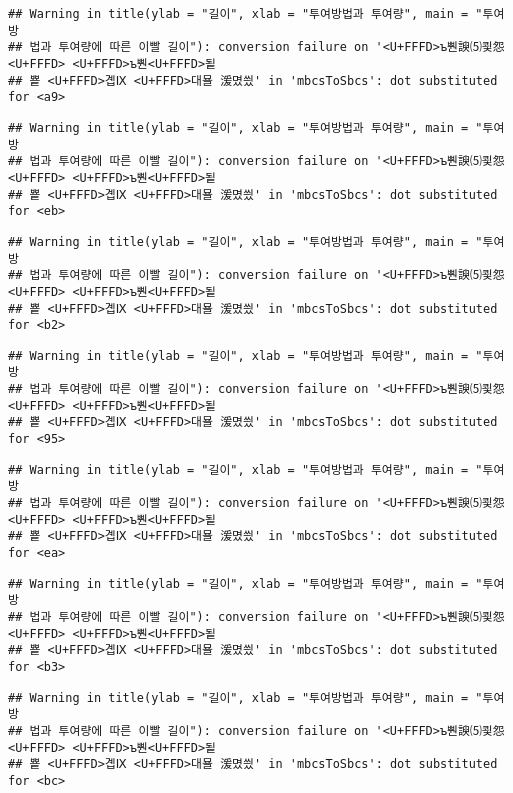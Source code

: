 \documentclass[]{article}
\begin{document}
\begin{verbatim}
## Warning in title(ylab = "길이", xlab = "투여방법과 투여량", main = "투여방
## 법과 투여량에 따른 이빨 길이"): conversion failure on '<U+FFFD>ъ뿬諛⑸쾿怨<U+FFFD> <U+FFFD>ъ뿬<U+FFFD>됱
## 뿉 <U+FFFD>곕Ⅸ <U+FFFD>대묠 湲몄씠' in 'mbcsToSbcs': dot substituted for <a9>
\end{verbatim}

\begin{verbatim}
## Warning in title(ylab = "길이", xlab = "투여방법과 투여량", main = "투여방
## 법과 투여량에 따른 이빨 길이"): conversion failure on '<U+FFFD>ъ뿬諛⑸쾿怨<U+FFFD> <U+FFFD>ъ뿬<U+FFFD>됱
## 뿉 <U+FFFD>곕Ⅸ <U+FFFD>대묠 湲몄씠' in 'mbcsToSbcs': dot substituted for <eb>
\end{verbatim}

\begin{verbatim}
## Warning in title(ylab = "길이", xlab = "투여방법과 투여량", main = "투여방
## 법과 투여량에 따른 이빨 길이"): conversion failure on '<U+FFFD>ъ뿬諛⑸쾿怨<U+FFFD> <U+FFFD>ъ뿬<U+FFFD>됱
## 뿉 <U+FFFD>곕Ⅸ <U+FFFD>대묠 湲몄씠' in 'mbcsToSbcs': dot substituted for <b2>
\end{verbatim}

\begin{verbatim}
## Warning in title(ylab = "길이", xlab = "투여방법과 투여량", main = "투여방
## 법과 투여량에 따른 이빨 길이"): conversion failure on '<U+FFFD>ъ뿬諛⑸쾿怨<U+FFFD> <U+FFFD>ъ뿬<U+FFFD>됱
## 뿉 <U+FFFD>곕Ⅸ <U+FFFD>대묠 湲몄씠' in 'mbcsToSbcs': dot substituted for <95>
\end{verbatim}

\begin{verbatim}
## Warning in title(ylab = "길이", xlab = "투여방법과 투여량", main = "투여방
## 법과 투여량에 따른 이빨 길이"): conversion failure on '<U+FFFD>ъ뿬諛⑸쾿怨<U+FFFD> <U+FFFD>ъ뿬<U+FFFD>됱
## 뿉 <U+FFFD>곕Ⅸ <U+FFFD>대묠 湲몄씠' in 'mbcsToSbcs': dot substituted for <ea>
\end{verbatim}

\begin{verbatim}
## Warning in title(ylab = "길이", xlab = "투여방법과 투여량", main = "투여방
## 법과 투여량에 따른 이빨 길이"): conversion failure on '<U+FFFD>ъ뿬諛⑸쾿怨<U+FFFD> <U+FFFD>ъ뿬<U+FFFD>됱
## 뿉 <U+FFFD>곕Ⅸ <U+FFFD>대묠 湲몄씠' in 'mbcsToSbcs': dot substituted for <b3>
\end{verbatim}

\begin{verbatim}
## Warning in title(ylab = "길이", xlab = "투여방법과 투여량", main = "투여방
## 법과 투여량에 따른 이빨 길이"): conversion failure on '<U+FFFD>ъ뿬諛⑸쾿怨<U+FFFD> <U+FFFD>ъ뿬<U+FFFD>됱
## 뿉 <U+FFFD>곕Ⅸ <U+FFFD>대묠 湲몄씠' in 'mbcsToSbcs': dot substituted for <bc>
\end{verbatim}
\end{document}
